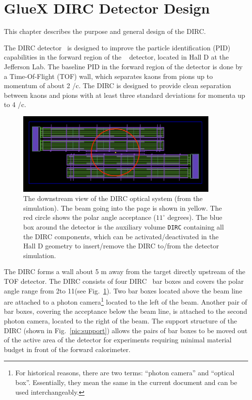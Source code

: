 \section{GlueX DIRC Detector Design}

This chapter describes the purpose and general design of the \gluex DIRC.
\vspace{0.5cm}

The \gluex DIRC detector~\cite{dirc} is designed to improve the particle identification (PID) capabilities in the forward region of the \gluex~\cite{gluex1, gluex2} detector, located in Hall D at the Jefferson Lab. The baseline PID in the forward region of the \gluex detector is done by a Time-Of-Flight (TOF) wall, which separates kaons from pions up to momentum of about 2 \gev/c. The \gluex DIRC is designed to provide clean separation between kaons and pions with at least three standard deviations for momenta up to 4 \gev/c.

\begin{figure}[!htb]
\centering
\includegraphics[width=0.9\textwidth]{pics/sim1.png}
\caption{\label{pic:sim}
The downstream view of the \gluex DIRC optical system (from the simulation). The beam going into the page is shown in yellow. The red circle shows the polar angle acceptance ($11^{\circ}$ degrees).
The blue box around the detector is the auxiliary volume \texttt{DIRC} containing all the DIRC components, which can be activated/deactivated in the Hall D geometry to insert/remove the \gluex DIRC to/from the \gluex detector simulation.}
\end{figure}

The \gluex DIRC forms a wall about 5 m away from the target directly upstream of the TOF detector. The DIRC consists of four \babar DIRC~\cite{bdirc1} bar boxes and covers the polar angle range from 2\mydeg to 11\mydeg (see Fig.~\ref{pic:sim}). Two bar boxes located above the beam line are attached to a photon camera\footnote{For historical reasons, there are two terms: ``photon camera'' and ``optical box''. Essentially, they mean the same in the current document and can be used interchangeably.} located to the left of the beam. Another pair of bar boxes, covering the acceptance below the beam line, is attached to the second photon camera, located to the right of the beam. The support structure of the DIRC (shown in Fig.~\ref{pic:support}) allows the pairs of bar boxes to be moved out of the active area of the detector for experiments requiring minimal material budget in front of the forward calorimeter.

